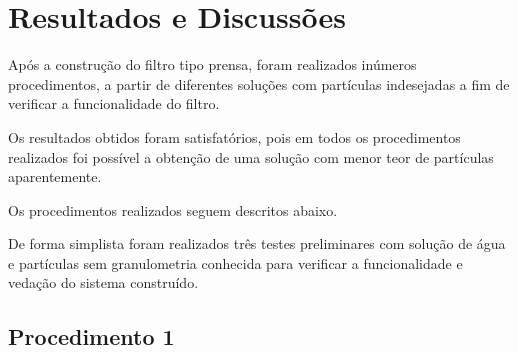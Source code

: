 \chapter{Resultados e Discussões}
\label{chap:resultados}

Após a construção do filtro tipo prensa, foram realizados inúmeros
procedimentos, a partir de diferentes soluções com partículas indesejadas a fim
de verificar a funcionalidade do filtro.

Os resultados obtidos foram satisfatórios, pois em todos os procedimentos
realizados foi possível a obtenção de uma solução com menor teor de partículas
aparentemente.

Os procedimentos realizados seguem descritos abaixo.

De forma simplista foram realizados três testes preliminares com solução de água
e partículas sem granulometria conhecida para verificar a funcionalidade e
vedação do sistema construído.

\section{Procedimento 1}
\label{sec:proc1}



